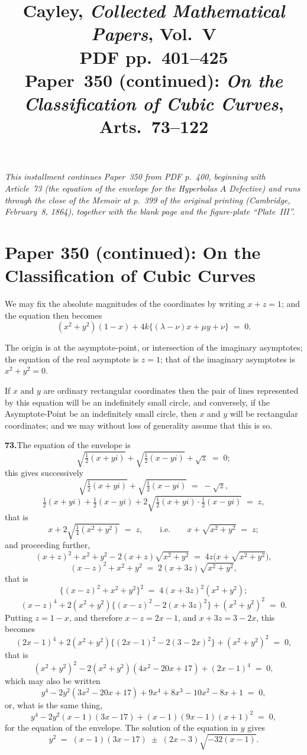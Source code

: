 \documentclass[11pt]{article}
\title{Cayley, \emph{Collected Mathematical Papers}, Vol.~V\\
PDF pp.\ 401--425\\
Paper~350 (continued): \textit{On the Classification of Cubic Curves}, Arts.\ 73--122}
\author{}
\date{}
\begin{document}
\maketitle

\noindent\textit{This installment continues Paper~350 from PDF p.~400, beginning with Article~73 (the equation of the envelope for the Hyperbolas $A$ Defective) and runs through the close of the Memoir at p.~399 of the original printing (Cambridge, February~8, 1864), together with the blank page and the figure-plate ``Plate~III''.}

\bigskip

\section*{Paper 350 (continued): On the Classification of Cubic Curves}

We may fix the absolute magnitudes of the coordinates by writing $x + z = 1$; and the equation then becomes
\[
(x^{2}+y^{2})(1-x) + 4k\bigl\{(\lambda - \nu)x + \mu y + \nu\bigr\} \;=\; 0.
\]

The origin is at the asymptote-point, or intersection of the imaginary asymptotes; the equation of the real asymptote is $z = 1$; that of the imaginary asymptotes is $x^{2}+y^{2}=0$.

If $x$ and $y$ are ordinary rectangular coordinates then the pair of lines represented by this equation will be an indefinitely small circle, and conversely, if the Asymptote-Point be an indefinitely small circle, then $x$ and $y$ will be rectangular coordinates; and we may without loss of generality assume that this is so.

\medskip
\textbf{73.}\quad The equation of the envelope is
\[
\sqrt{\tfrac{1}{2}(x+yi)} + \sqrt{\tfrac{1}{2}(x-yi)} + \sqrt{z} \;=\; 0;
\]
this gives successively
\[
\sqrt{\tfrac{1}{2}(x+yi)} + \sqrt{\tfrac{1}{2}(x-yi)} \;=\; -\sqrt{z},
\]
\[
\tfrac{1}{2}(x+yi) + \tfrac{1}{2}(x-yi) + 2\sqrt{\tfrac{1}{2}(x+yi)\cdot\tfrac{1}{2}(x-yi)} \;=\; z,
\]
that is
\[
x + 2\sqrt{\tfrac{1}{4}(x^{2}+y^{2})} \;=\; z, \qquad\text{i.e.}\qquad x + \sqrt{x^{2}+y^{2}} \;=\; z;
\]
and proceeding further,
\[
(x+z)^{2} + x^{2}+y^{2} - 2(x+z)\sqrt{x^{2}+y^{2}} \;=\; 4z\bigl(x + \sqrt{x^{2}+y^{2}}\bigr),
\]
\[
(x-z)^{2} + x^{2}+y^{2} \;=\; 2(x+3z)\sqrt{x^{2}+y^{2}},
\]
that is
\[
\bigl\{(x-z)^{2} + x^{2}+y^{2}\bigr\}^{2} \;=\; 4(x+3z)^{2}(x^{2}+y^{2});
\]
\[
(x-z)^{4} + 2(x^{2}+y^{2})\bigl\{(x-z)^{2} - 2(x+3z)^{2}\bigr\} + (x^{2}+y^{2})^{2} \;=\; 0.
\]
Putting $z = 1 - x$, and therefore $x - z = 2x - 1$, and $x + 3z = 3 - 2x$, this becomes
\[
(2x-1)^{4} + 2(x^{2}+y^{2})\bigl\{(2x-1)^{2} - 2(3-2x)^{2}\bigr\} + (x^{2}+y^{2})^{2} \;=\; 0,
\]
that is
\[
(x^{2}+y^{2})^{2} - 2(x^{2}+y^{2})(4x^{2} - 20x + 17) + (2x-1)^{4} \;=\; 0,
\]
which may also be written
\[
y^{4} - 2y^{2}(3x^{2} - 20x + 17) + 9x^{4} + 8x^{3} - 10x^{2} - 8x + 1 \;=\; 0,
\]
or, what is the same thing,
\[
y^{4} - 2y^{2}(x-1)(3x-17) + (x-1)(9x-1)(x+1)^{2} \;=\; 0,
\]
for the equation of the envelope. The solution of the equation in $y$ gives
\[
y^{2} \;=\; (x-1)(3x-17) \;\pm\; (2x-3)\sqrt{-32(x-1)}.
\]
\end{document}
